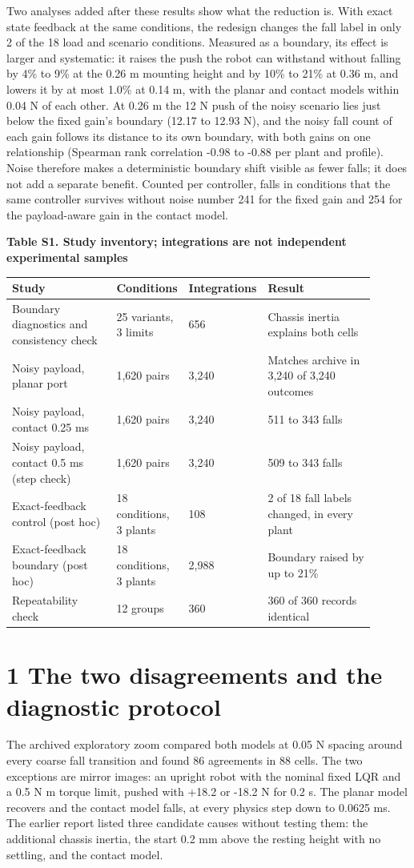 \documentclass[11pt,a4paper]{article}
\begin{document}
Two analyses added after these results show what the reduction is. With exact state feedback at the same conditions, the redesign changes the fall label in only 2 of the 18 load and scenario conditions. Measured as a boundary, its effect is larger and systematic: it raises the push the robot can withstand without falling by 4\% to 9\% at the 0.26 m mounting height and by 10\% to 21\% at 0.36 m, and lowers it by at most 1.0\% at 0.14 m, with the planar and contact models within 0.04 N of each other. At 0.26 m the 12 N push of the noisy scenario lies just below the fixed gain's boundary (12.17 to 12.93 N), and the noisy fall count of each gain follows its distance to its own boundary, with both gains on one relationship (Spearman rank correlation -0.98 to -0.88 per plant and profile). Noise therefore makes a deterministic boundary shift visible as fewer falls; it does not add a separate benefit. Counted per controller, falls in conditions that the same controller survives without noise number 241 for the fixed gain and 254 for the payload-aware gain in the contact model.

\textbf{Table S1. Study inventory; integrations are not independent experimental samples}
\begin{longtable}{p{0.297\linewidth}p{0.171\linewidth}p{0.126\linewidth}p{0.306\linewidth}}
\toprule
Study & Conditions & Integrations & Result \\ \midrule \endhead
Boundary diagnostics and consistency check & 25 variants, 3 limits & 656 & Chassis inertia explains both cells \\
Noisy payload, planar port & 1,620 pairs & 3,240 & Matches archive in 3,240 of 3,240 outcomes \\
Noisy payload, contact 0.25 ms & 1,620 pairs & 3,240 & 511 to 343 falls \\
Noisy payload, contact 0.5 ms (step check) & 1,620 pairs & 3,240 & 509 to 343 falls \\
Exact-feedback control (post hoc) & 18 conditions, 3 plants & 108 & 2 of 18 fall labels changed, in every plant \\
Exact-feedback boundary (post hoc) & 18 conditions, 3 plants & 2,988 & Boundary raised by up to 21\% \\
Repeatability check & 12 groups & 360 & 360 of 360 records identical \\
\bottomrule
\end{longtable}
\clearpage
\section*{1 The two disagreements and the diagnostic protocol}
The archived exploratory zoom compared both models at 0.05 N spacing around every coarse fall transition and found 86 agreements in 88 cells. The two exceptions are mirror images: an upright robot with the nominal fixed LQR and a 0.5 N m torque limit, pushed with +18.2 or -18.2 N for 0.2 s. The planar model recovers and the contact model falls, at every physics step down to 0.0625 ms. The earlier report listed three candidate causes without testing them: the additional chassis inertia, the start 0.2 mm above the resting height with no settling, and the contact model.
\end{document}
